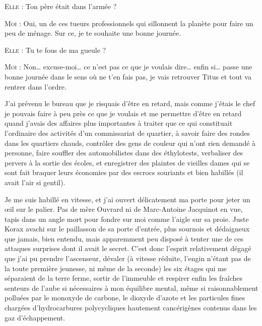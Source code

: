 \begin{dialogue}
\textsc{Elle} : Ton père était dans l’armée ?

\textsc{Moi} : Oui, un de ces tueurs professionnels qui sillonnent la planète pour faire un peu de ménage. Sur ce, je te souhaite une bonne journée.

\textsc{Elle} : Tu te fous de ma gueule ?

\textsc{Moi} : Non… excuse-moi… ce n’est pas ce que je voulais dire… enfin si… passe une bonne journée dans le sens où ne t’en fais pas, je vais retrouver Titus et tout va rentrer dans l’ordre.

\end{dialogue}

J’ai prévenu le bureau que je risquais d’être en retard, mais comme j’étais le chef je pouvais faire à peu près ce que je voulais et me permettre d’être en retard quand j’avais des affaires plus importantes à traiter que ce qui constituait l’ordinaire des activités d’un commissariat de quartier, à savoir faire des rondes dans les quartiers chauds, contrôler des gens de couleur qui n’ont rien demandé à personne, faire souffler des automobilistes dans des éthylotests, verbaliser des pervers à la sortie des écoles, et enregistrer des plaintes de vieilles dames qui se sont fait braquer leurs économies par des escrocs souriants et bien habillés (il avait l’air si gentil).

Je me suis habillé en vitesse, et j’ai ouvert délicatement ma porte pour jeter un œil sur le palier. Pas de mère Ouvrard ni de Marc-Antoine Jacquinot en vue, tapis dans un angle mort pour fondre sur moi comme l’aigle sur sa proie. Juste Korax avachi sur le paillasson de sa porte d’entrée, plus sournois et dédaigneux que jamais, bien entendu, mais apparemment peu disposé à tenter une de ces attaques surprises dont il avait le secret. C’est donc l’esprit relativement dégagé que j’ai pu prendre l’ascenseur, dévaler (à vitesse réduite, l’engin n’étant pas de la toute première jeunesse, ni même de la seconde) les six étages qui me séparaient de la terre ferme, sortir de l’immeuble et respirer enfin les fraîches senteurs de l’aube si nécessaires à mon équilibre mental, même si raisonnablement polluées par le monoxyde de carbone, le dioxyde d’azote et les particules fines chargées d’hydrocarbures polycycliques hautement cancérigènes contenus dans les gaz d’échappement.

